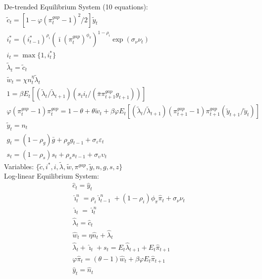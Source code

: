 \documentclass[12pt, final]{article}
\begin{document}
\setcounter{equation}{0}
\noindent De-trended Equilibrium System (10 equations):
\small\begin{gather}
\tilde{c}_t = [1-\varphi(\pi_t^{gap} - 1)^2/2]\tilde{y}_t\\
i_t^*=(i^*_{t-1})^{\rho_i}(\bar{\imath}(\pi_t^{gap})^{\phi_\pi})^{1-\rho_i}\exp(\sigma_\nu\nu_t)\\
i_t=\max\{1,i_t^*\}\\
\tilde{\lambda}_t = \tilde{c}_t\\
\tilde{w}_t = \chi n_t^\eta \tilde{\lambda}_t  \\
  1 = \beta E_t[(\tilde{\lambda}_t/\tilde{\lambda}_{t+1})(s_ti_t/(\bar{\pi}\pi_{t+1}^{gap}g_{t+1}))]\\
  \varphi(\pi_t^{gap}-1){\pi}_t^{gap} = 1-\theta + \theta\tilde{w}_t + \beta\varphi E_t[(\tilde{\lambda}_t/\tilde{\lambda}_{t+1}) (\pi_{t+1}^{gap}-1)\pi_{t+1}^{gap}(\tilde{y}_{t+1}/\tilde{y}_t)]\\
  \tilde{y}_t= n_t\\  
  g_t= (1-\rho_g)\bar{g}+\rho_gg_{t-1} + \sigma_\varepsilon\varepsilon_t \\
  s_t=(1-\rho_s)s_t+\rho_ss_{t-1} + \sigma_\upsilon\upsilon_t
\end{gather}
Variables: $\{\tilde{c},i^*,i,\tilde{\lambda},\tilde{w},\pi^{gap},\tilde{y},n,g,s,z\}$\\ 

\setcounter{equation}{0}
\noindent Log-linear Equilibrium System:
\begin{gather}
  \hat{c}_t = \hat{y}_t\\
  \hat{\imath}_t^n = \rho_i\hat{\imath}^n_{t-1} + (1-\rho_i)\phi_\pi\hat{\pi}_t+\sigma_\nu\nu_t \\
  \hat{\imath}_t = \hat{\imath}_t^n\\
  \hat{\lambda}_t = \hat{c}_t \\
  \hat{w}_t =  \eta\hat{n}_t + \hat{\lambda}_t\\
  \hat{\lambda}_t + \hat{\imath}_t + s_t  = E_t\hat{\lambda}_{t+1}+E_t\hat{\pi}_{t+1} \\
  \varphi\hat{\pi}_t = (\theta-1)\hat{w}_t+\beta\varphi E_t\hat{\pi}_{t+1}\\
  \hat{y}_t = \hat{n}_t 
\end{gather}
\pagebreak
\setcounter{equation}{0}
\end{document}
